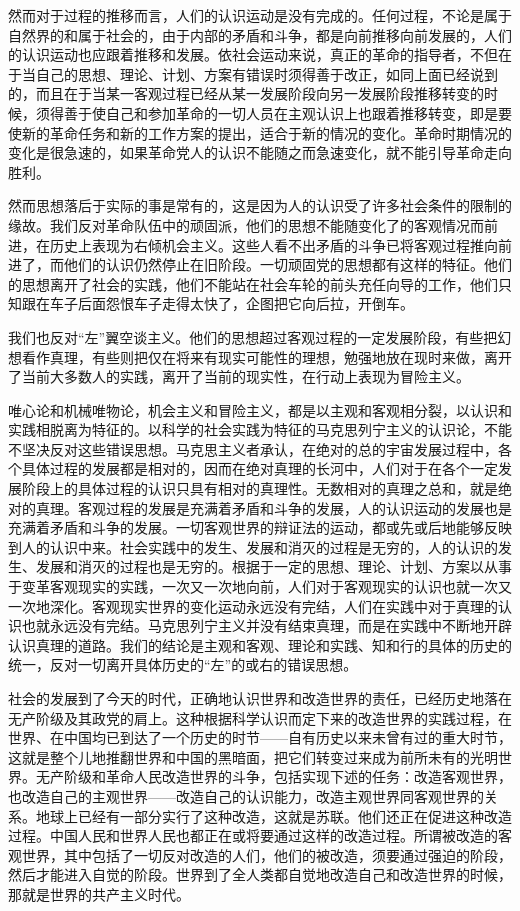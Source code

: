 然而对于过程的推移而言，人们的认识运动是没有完成的。任何过程，不论是属于自然界的和属于社会的，由于内部的矛盾和斗争，都是向前推移向前发展的，人们的认识运动也应跟着推移和发展。依社会运动来说，真正的革命的指导者，不但在于当自己的思想、理论、计划、方案有错误时须得善于改正，如同上面已经说到的，而且在于当某一客观过程已经从某一发展阶段向另一发展阶段推移转变的时候，须得善于使自己和参加革命的一切人员在主观认识上也跟着推移转变，即是要使新的革命任务和新的工作方案的提出，适合于新的情况的变化。革命时期情况的变化是很急速的，如果革命党人的认识不能随之而急速变化，就不能引导革命走向胜利。

然而思想落后于实际的事是常有的，这是因为人的认识受了许多社会条件的限制的缘故。我们反对革命队伍中的顽固派，他们的思想不能随变化了的客观情况而前进，在历史上表现为右倾机会主义。这些人看不出矛盾的斗争已将客观过程推向前进了，而他们的认识仍然停止在旧阶段。一切顽固党的思想都有这样的特征。他们的思想离开了社会的实践，他们不能站在社会车轮的前头充任向导的工作，他们只知跟在车子后面怨恨车子走得太快了，企图把它向后拉，开倒车。

我们也反对“左”翼空谈主义。他们的思想超过客观过程的一定发展阶段，有些把幻想看作真理，有些则把仅在将来有现实可能性的理想，勉强地放在现时来做，离开了当前大多数人的实践，离开了当前的现实性，在行动上表现为冒险主义。

唯心论和机械唯物论，机会主义和冒险主义，都是以主观和客观相分裂，以认识和实践相脱离为特征的。以科学的社会实践为特征的马克思列宁主义的认识论，不能不坚决反对这些错误思想。马克思主义者承认，在绝对的总的宇宙发展过程中，各个具体过程的发展都是相对的，因而在绝对真理的长河中，人们对于在各个一定发展阶段上的具体过程的认识只具有相对的真理性。无数相对的真理之总和，就是绝对的真理。客观过程的发展是充满着矛盾和斗争的发展，人的认识运动的发展也是充满着矛盾和斗争的发展。一切客观世界的辩证法的运动，都或先或后地能够反映到人的认识中来。社会实践中的发生、发展和消灭的过程是无穷的，人的认识的发生、发展和消灭的过程也是无穷的。根据于一定的思想、理论、计划、方案以从事于变革客观现实的实践，一次又一次地向前，人们对于客观现实的认识也就一次又一次地深化。客观现实世界的变化运动永远没有完结，人们在实践中对于真理的认识也就永远没有完结。马克思列宁主义并没有结束真理，而是在实践中不断地开辟认识真理的道路。我们的结论是主观和客观、理论和实践、知和行的具体的历史的统一，反对一切离开具体历史的“左”的或右的错误思想。

社会的发展到了今天的时代，正确地认识世界和改造世界的责任，已经历史地落在无产阶级及其政党的肩上。这种根据科学认识而定下来的改造世界的实践过程，在世界、在中国均已到达了一个历史的时节——自有历史以来未曾有过的重大时节，这就是整个儿地推翻世界和中国的黑暗面，把它们转变过来成为前所未有的光明世界。无产阶级和革命人民改造世界的斗争，包括实现下述的任务：改造客观世界，也改造自己的主观世界——改造自己的认识能力，改造主观世界同客观世界的关系。地球上已经有一部分实行了这种改造，这就是苏联。他们还正在促进这种改造过程。中国人民和世界人民也都正在或将要通过这样的改造过程。所谓被改造的客观世界，其中包括了一切反对改造的人们，他们的被改造，须要通过强迫的阶段，然后才能进入自觉的阶段。世界到了全人类都自觉地改造自己和改造世界的时候，那就是世界的共产主义时代。

